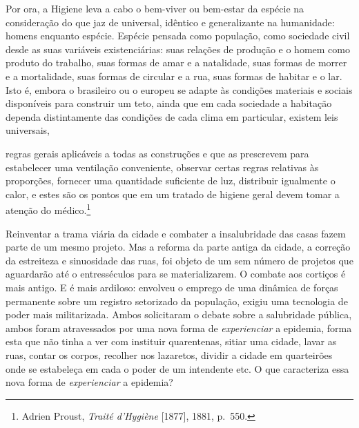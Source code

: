 Por ora, a Higiene leva a cabo o bem-viver ou bem-estar da espécie na
consideração do que jaz de universal, idêntico e generalizante na
humanidade: homens enquanto espécie. Espécie pensada como população,
como sociedade civil desde as suas variáveis existenciárias: suas
relações de produção e o homem como produto do trabalho, suas formas de
amar e a natalidade, suas formas de morrer e a mortalidade, suas formas
de circular e a rua, suas formas de habitar e o lar. Isto é, embora o
brasileiro ou o europeu se adapte às condições materiais e sociais
disponíveis para construir um teto, ainda que em cada sociedade a
habitação dependa distintamente das condições de cada clima em
particular, existem leis universais,

regras gerais aplicáveis a todas as construções e que as prescrevem para
estabelecer uma ventilação conveniente, observar certas regras relativas
às proporções, fornecer uma quantidade suficiente de luz, distribuir
igualmente o calor, e estes são os pontos que em um tratado de higiene
geral devem tomar a atenção do médico.\footnote{Adrien Proust,
  \emph{Traité d'Hygiène} {[}1877{]}, 1881, p.~550.}

Reinventar a trama viária da cidade e combater a insalubridade das casas
fazem parte de um mesmo projeto. Mas a reforma da parte antiga da
cidade, a correção da estreiteza e sinuosidade das ruas, foi objeto de
um sem número de projetos que aguardarão até o entresséculos para se
materializarem. O combate aos cortiços é mais antigo. E é mais ardiloso:
envolveu o emprego de uma dinâmica de forças permanente sobre um
registro setorizado da população, exigiu uma tecnologia de poder mais
militarizada. Ambos solicitaram o debate sobre a salubridade pública,
ambos foram atravessados por uma nova forma de \emph{experienciar} a
epidemia, forma esta que não tinha a ver com instituir quarentenas,
sitiar uma cidade, lavar as ruas, contar os corpos, recolher nos
lazaretos, dividir a cidade em quarteirões onde se estabeleça em cada o
poder de um intendente etc. O que caracteriza essa nova forma de
\emph{experienciar} a epidemia?

